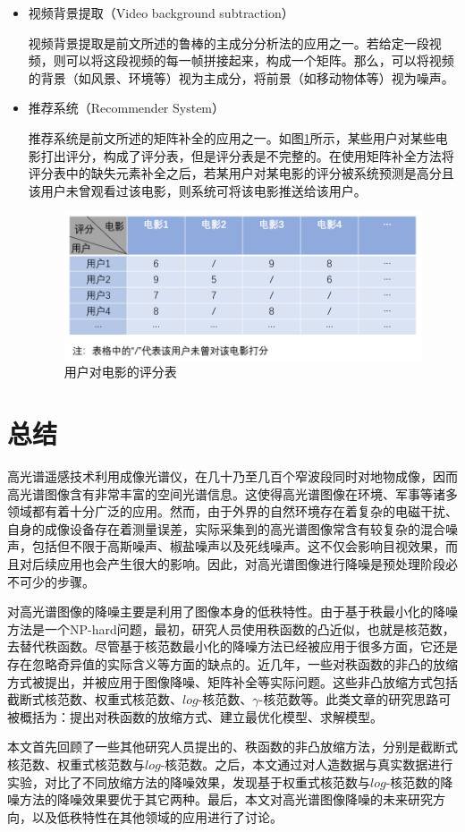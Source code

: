 \documentclass[12pt, a4paper]{article}
\begin{document}
\begin{itemize}
		
\item 视频背景提取（Video background subtraction）
\par 视频背景提取是前文所述的鲁棒的主成分分析法的应用之一。若给定一段视频，则可以将这段视频的每一帧拼接起来，构成一个矩阵。那么，可以将视频的背景（如风景、环境等）视为主成分，将前景（如移动物体等）视为噪声。
\item 推荐系统（Recommender System）
\par 推荐系统是前文所述的矩阵补全的应用之一。如图\ref{recommender-system}所示，某些用户对某些电影打出评分，构成了评分表，但是评分表是不完整的。在使用矩阵补全方法将评分表中的缺失元素补全之后，若某用户对某电影的评分被系统预测是高分且该用户未曾观看过该电影，则系统可将该电影推送给该用户。
\begin{figure}[H]
\centering
\includegraphics[scale=0.7]{recommender-system.png}
\caption{用户对电影的评分表}
\label{recommender-system}
\end{figure}
\end{itemize}
\newpage
\section{总结}
\par 高光谱遥感技术利用成像光谱仪，在几十乃至几百个窄波段同时对地物成像，因而高光谱图像含有非常丰富的空间光谱信息。这使得高光谱图像在环境、军事等诸多领域都有着十分广泛的应用。然而，由于外界的自然环境存在着复杂的电磁干扰、自身的成像设备存在着测量误差，实际采集到的高光谱图像常含有较复杂的混合噪声，包括但不限于高斯噪声、椒盐噪声以及死线噪声。这不仅会影响目视效果，而且对后续应用也会产生很大的影响。因此，对高光谱图像进行降噪是预处理阶段必不可少的步骤。
\par 对高光谱图像的降噪主要是利用了图像本身的低秩特性。由于基于秩最小化的降噪方法是一个NP-hard问题，最初，研究人员使用秩函数的凸近似，也就是核范数，去替代秩函数。尽管基于核范数最小化的降噪方法已经被应用于很多方面，它还是存在忽略奇异值的实际含义等方面的缺点的。近几年，一些对秩函数的非凸的放缩方式被提出，并被应用于图像降噪、矩阵补全等实际问题。这些非凸放缩方式包括截断式核范数、权重式核范数、$log$-核范数、$\gamma$-核范数等。此类文章的研究思路可被概括为：提出对秩函数的放缩方式、建立最优化模型、求解模型。
\par 本文首先回顾了一些其他研究人员提出的、秩函数的非凸放缩方法，分别是截断式核范数、权重式核范数与$log$-核范数。之后，本文通过对人造数据与真实数据进行实验，对比了不同放缩方法的降噪效果，发现基于权重式核范数与$log$-核范数的降噪方法的降噪效果要优于其它两种。最后，本文对高光谱图像降噪的未来研究方向，以及低秩特性在其他领域的应用进行了讨论。
	
\end{document}
